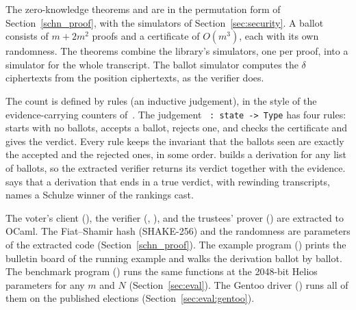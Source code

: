 The zero-knowledge theorems  and  are in
the permutation form of Section~\ref{schn_proof}, with the simulators of
Section~\ref{sec:security}. A ballot consists of $m + 2m^2$ proofs and
a certificate of $O(m^3)$, each with its own randomness. The theorems
combine the library's simulators, one per proof, into a simulator for
the whole transcript.
The ballot simulator computes the $\delta$ ciphertexts from the position
ciphertexts, as the verifier does.

The count is defined by rules (an inductive judgement), in the style of
the evidence-carrying counters of~\cite{10.1007/978-3-319-66107-0_26,haines2019verifiable}. 
The judgement
~\texttt{:~state -> Type} has four rules:  starts
with no ballots,  accepts a ballot,  rejects
one, and  checks the certificate and gives the verdict.
Every rule keeps the invariant that the ballots seen are exactly the
accepted and the rejected ones, in some order.
 builds a derivation for any list of ballots,
so the extracted verifier returns its verdict together with the
evidence.  says that a derivation that ends in a true
verdict, with rewinding transcripts, names a Schulze winner of the
rankings cast. 

The voter's client (), the verifier
(, ), and the
trustees' prover () are extracted to OCaml.
The Fiat--Shamir hash (SHAKE-256) and the randomness are parameters of
the extracted code (Section~\ref{schn_proof}). The example program
() prints the bulletin board of the
running example and walks the  derivation ballot by ballot.
The benchmark program () runs the same
functions at the 2048-bit Helios parameters for any $m$ and $N$
(Section~\ref{sec:eval}). The Gentoo driver ()
runs all of them on the published elections
(Section~\ref{sec:eval:gentoo}).
